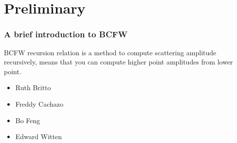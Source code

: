 \documentclass{beamer}
\begin{document}
\section{Preliminary}
\begin{frame}
    \frametitle{A brief introduction to BCFW}
    BCFW recursion relation is a method to compute scattering amplitude recursively, means that you can 
    compute higher point amplitudes from lower point.
    \par
 \begin{itemize}[label=\textbullet]
    \item Ruth Britto
    \item Freddy Cachazo
    \item Bo Feng
    \item Edward Witten
 \end{itemize}
 


\begin{tikzpicture}[x=0.75pt,y=0.75pt,yscale=-1,xscale=1]


\end{tikzpicture}
\end{frame}
\end{document}
